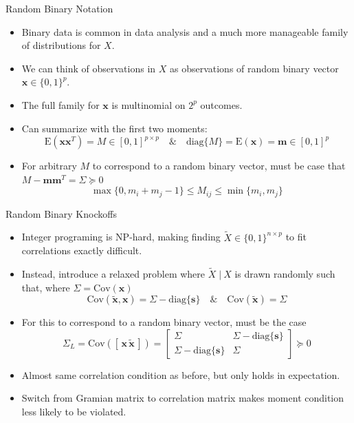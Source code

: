 \documentclass{beamer}
\newcommand{\E}{\mathrm{E}}
\newcommand{\cov}{\mathrm{Cov}}
\newcommand{\st}{ \; \big | \:}
\newcommand{\diag}[1]{\mathrm{diag}\{#1\}}
\begin{document}
\begin{frame}{Random Binary Notation}
    \begin{itemize}
        \item Binary data is common in data analysis and a much more manageable family of distributions for $X$.
        \item We can think of observations in $X$ as observations of random binary vector $\mathbf x\in\{0,1\}^p$.
        \item The full family for $\mathbf x$ is multinomial on $2^p$ outcomes.
        \item Can summarize with the first two moments: 
            \[ \E(\mathbf{x}\mathbf{x}^T) = M \in [0,1]^{p\times p} \quad \& \quad \diag{M} = \E(\mathbf x) = \mathbf{m} \in [0,1]^p  \]
        \item For arbitrary $M$ to correspond to a random binary vector, must be case that $ M-\mathbf{m}\mathbf{m}^T = \Sigma \succeq0$
            \[\max\{0,m_i+m_j -1\} \leq M_{ij} \leq \min\{m_i,m_j\} \]

    \end{itemize}
\end{frame}

\begin{frame}{Random Binary Knockoffs}
    \begin{itemize}
        \item Integer programing is NP-hard, making finding $\tilde X\in\{0,1\}^{n\times p}$ to fit correlations exactly difficult. 
        \item Instead, introduce a relaxed problem where $\tilde X\st X$ is drawn randomly such that, where $\Sigma=\cov(\mathbf x)$
            \[ \cov(\mathbf{\tilde x}, \mathbf x) = \Sigma - \diag{\mathbf s} \quad \& \quad \cov(\mathbf{\tilde x}) = \Sigma \]
        \item For this to correspond to a random binary vector, must be the case
            \[ \Sigma_L =\cov([\,\mathbf x\,\mathbf{\tilde x}\,]) = \left[ \begin{array}{cc} \Sigma & \Sigma - \diag{\mathbf s} \\ \Sigma - \diag{\mathbf s} & \Sigma \end{array}\right] \succeq 0 \]
        \item Almost same correlation condition as before, but only holds in expectation.
        \item Switch from Gramian matrix to correlation matrix makes moment condition less likely to be violated. 
    \end{itemize}
\end{frame}
\end{document}
